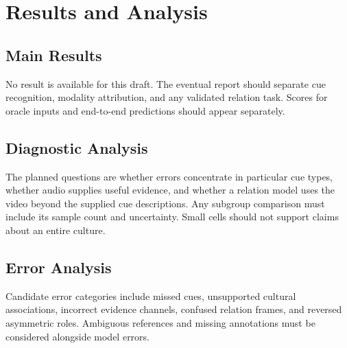\section{Results and Analysis}
\label{sec:analysis}

\subsection{Main Results}
No result is available for this draft. The eventual report should separate
cue recognition, modality attribution, and any validated relation task.
Scores for oracle inputs and end-to-end predictions should appear separately.

\subsection{Diagnostic Analysis}
The planned questions are whether errors concentrate in particular cue
types, whether audio supplies useful evidence, and whether a relation model
uses the video beyond the supplied cue descriptions. Any subgroup comparison
must include its sample count and uncertainty. Small cells should not support
claims about an entire culture.

\subsection{Error Analysis}
Candidate error categories include missed cues, unsupported cultural
associations, incorrect evidence channels, confused relation frames, and
reversed asymmetric roles. Ambiguous references and missing annotations
must be considered alongside model errors.
